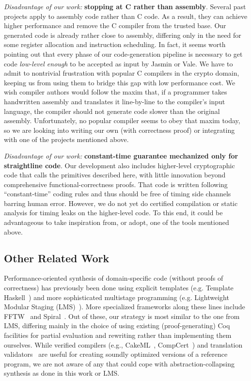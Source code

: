 \documentclass[conference,letterpaper]{IEEEtran}
\begin{document}
\emph{Disadvantage of our work:} \textbf{stopping at C rather than assembly}.
Several past projects apply to assembly code rather than C code.
As a result, they can achieve higher performance and remove the C compiler from the trusted base.
Our generated code is already rather close to assembly, differing only in the need for some register allocation and instruction scheduling.
In fact, it seems worth pointing out that every phase of our code-generation pipeline is necessary to get code \emph{low-level enough} to be accepted as input by Jasmin or Vale.
We have to admit to nontrivial frustration with popular C compilers in the crypto domain, keeping us from using them to bridge this gap with low performance cost.
We wish compiler authors would follow the maxim that, if a programmer takes handwritten assembly and translates it line-by-line to the compiler's input language, the compiler should not generate code slower than the original assembly.
Unfortunately, no popular compiler seems to obey that maxim today, so we are looking into writing our own (with correctness proof) or integrating with one of the projects mentioned above.

\emph{Disadvantage of our work:} \textbf{constant-time guarantee mechanized only for straightline code}.
Our development also includes higher-level cryptographic code that calls the primitives described here, with little innovation beyond comprehensive functional-correctness proofs.
That code is written following ``constant-time'' coding rules and thus should be free of timing side channels barring human error.
However, we do not yet do certified compilation or static analysis for timing leaks on the higher-level code.
To this end, it could be advantageous to take inspiration from, or adopt, one of the tools mentioned above.

\subsection{Other Related Work}

Performance-oriented synthesis of domain-specific code (without proofs of correctness) has previously been done using explicit templates (e.g. Template Haskell~\cite{TemplateHaskell}) and more sophisticated multistage programming (e.g. Lightweight Modular Staging (LMS)~\cite{LMS}).
More specialized frameworks along these lines include FFTW~\cite{FFTW} and Spiral~\cite{SPIRAL}.
Out of these, our strategy is most similar to the one from LMS, differing mainly in the choice of using existing (proof-generating) Coq facilities for partial evaluation and rewriting rather than implementing them ourselves.
While verified compilers (e.g., CakeML~\cite{CakeML}, CompCert~\cite{Compcert}) and translation validators~\cite{NeculaTransVal} are useful for creating soundly optimized versions of a reference program, we are not aware of any that could cope with abstraction-collapsing synthesis as done in this work or LMS.
\end{document}
